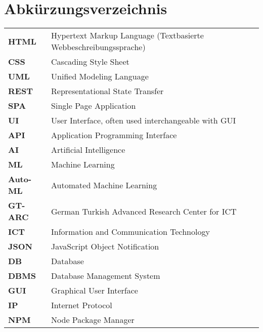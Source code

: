{}
\chapter*{Abkürzungsverzeichnis}

\begin{center}
\begin{tabular}{ll}

\textbf{HTML}	&	Hypertext Markup Language (Textbasierte Webbeschreibungssprache)\\
\textbf{CSS}	&	Cascading Style Sheet\\
\textbf{UML}	&	Unified Modeling Language\\
\textbf{REST}	&	Representational State Transfer\\
\textbf{SPA}	&	Single Page Application\\
\textbf{UI}		&	User Interface, often used interchangeable with GUI\\
\textbf{API}	&	Application Programming Interface\\
\textbf{AI}		&	Artificial Intelligence\\
\textbf{ML}	&	Machine Learning\\
\textbf{Auto-ML}	&	Automated Machine Learning\\
\textbf{GT-ARC}	&	German Turkish Advanced Research Center for ICT\\
\textbf{ICT}	&	Information and Communication Technology\\
\textbf{JSON}	&	JavaScript Object Notification\\
\textbf{DB}	&	Database\\
\textbf{DBMS}	&	Database Management System\\
\textbf{GUI}	&	Graphical User Interface\\
\textbf{IP}	&	Internet Protocol\\
\textbf{NPM}	&	Node Package Manager\\




\end{tabular}
\end{center}














